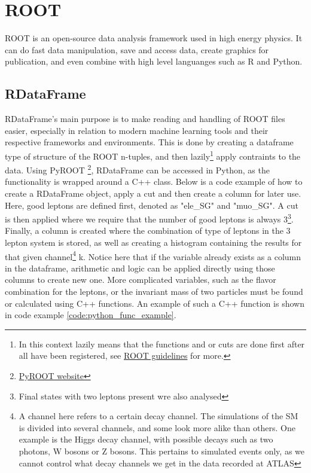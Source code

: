 \section{ROOT}
ROOT is an open-source data analysis framework used in high energy physics. It can do fast data manipulation, save and access data, 
create graphics for publication, and even combine with high level languanges such as R and Python.


\subsection*{RDataFrame}
RDataFrame's main purpose is to make reading and handling of ROOT files easier, especially in 
relation to modern machine learning tools and their respective frameworks and environments. 
This is done by creating a dataframe type of structure of the ROOT n-tuples, and then 
lazily\footnote{In this context lazily means that the functions and or cuts are done first after 
all have been registered, see \href{https://root.cern/doc/master/classROOT_1_1RDataFrame.html}{ROOT 
guidelines} for more.} apply contraints to the data. Using PyROOT
\footnote{\href{https://root.cern/manual/python/}{PyROOT website}}, RDataFrame can be accessed in 
Python, as the functionality is wrapped around a C++ class. Below is a code example of how
to create a RDataFrame object, apply a cut and then create a column for later use. Here, good 
leptons are defined first, denoted as "ele\_SG" and "muo\_SG". A cut is then applied where we 
require that the number of good leptons is always 3\footnote{Final states with two leptons present wre also analysed}. 
Finally, a column is created where the 
combination of type of leptons in the 3 lepton system is stored, as well as creating a histogram 
containing the results for that given channel\footnote{A channel here refers to a certain decay 
channel. The simulations of the SM is divided into several channels, and some look more alike than others. One example is 
the Higgs decay channel, with possible decays such as two photons, W bosons or Z bosons. This pertains 
to simulated events only, as we cannot control what decay channels we get in the data recorded at ATLAS} 
k. Notice here that if the variable already exists as a column in the dataframe, arithmetic and logic 
can be applied directly using those columns to create new one. More complicated variables, such as 
the flavor combination for the leptons, or the invariant mass of two particles must be found or 
calculated using C++ functions. An example of such a C++ function is shown in code example \ref{code:python_func_example}.

